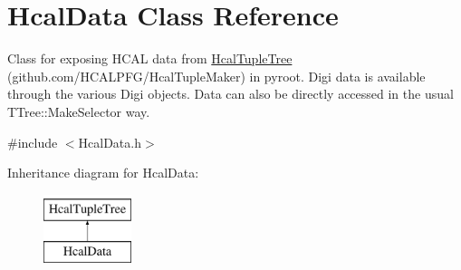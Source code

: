 \hypertarget{class_hcal_data}{}\section{Hcal\+Data Class Reference}
\label{class_hcal_data}


Class for exposing H\+C\+A\+L data from \hyperlink{class_hcal_tuple_tree}{Hcal\+Tuple\+Tree} (github.\+com/\+H\+C\+A\+L\+P\+F\+G/\+Hcal\+Tuple\+Maker) in pyroot. Digi data is available through the various Digi objects. Data can also be directly accessed in the usual T\+Tree\+::\+Make\+Selector way.  




{\ttfamily \#include $<$Hcal\+Data.\+h$>$}

Inheritance diagram for Hcal\+Data\+:\begin{figure}[H]
\begin{center}
\leavevmode
\includegraphics[height=2.000000cm]{class_hcal_data}
\end{center}
\end{figure}
